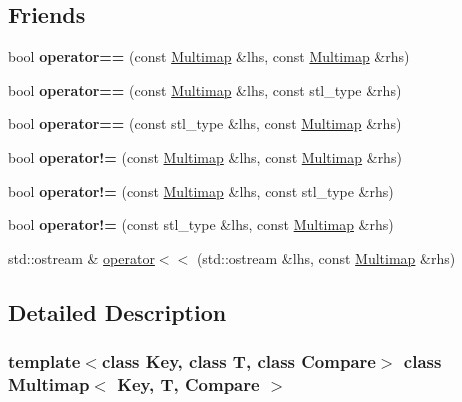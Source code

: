 \subsection*{Friends}
\begin{DoxyCompactItemize}
\item 
\mbox{\label{classMultimap_a6a1747a11110a47ddccb947d8727c1db}} 
bool {\bfseries operator==} (const \hyperlink{classMultimap}{Multimap} \&lhs, const \hyperlink{classMultimap}{Multimap} \&rhs)
\item 
\mbox{\label{classMultimap_aa727e58dd28602ada5511260bc380d92}} 
bool {\bfseries operator==} (const \hyperlink{classMultimap}{Multimap} \&lhs, const stl\+\_\+type \&rhs)
\item 
\mbox{\label{classMultimap_aca3fa84add2579de08ecae95debb4d4d}} 
bool {\bfseries operator==} (const stl\+\_\+type \&lhs, const \hyperlink{classMultimap}{Multimap} \&rhs)
\item 
\mbox{\label{classMultimap_aa11fe172d670ef1bbb20888e437bed4b}} 
bool {\bfseries operator!=} (const \hyperlink{classMultimap}{Multimap} \&lhs, const \hyperlink{classMultimap}{Multimap} \&rhs)
\item 
\mbox{\label{classMultimap_ae4bcd97f54c81f8947d18451137c1bfe}} 
bool {\bfseries operator!=} (const \hyperlink{classMultimap}{Multimap} \&lhs, const stl\+\_\+type \&rhs)
\item 
\mbox{\label{classMultimap_a977585e743d4f074d345ed129b0e0853}} 
bool {\bfseries operator!=} (const stl\+\_\+type \&lhs, const \hyperlink{classMultimap}{Multimap} \&rhs)
\item 
std\+::ostream \& \hyperlink{classMultimap_a3a9cc0a79670c0bf02221d1cde83e1e0}{operator$<$$<$} (std\+::ostream \&lhs, const \hyperlink{classMultimap}{Multimap} \&rhs)
\end{DoxyCompactItemize}


\subsection{Detailed Description}
\subsubsection*{template$<$class Key, class T, class Compare$>$\newline
class Multimap$<$ Key, T, Compare $>$}


